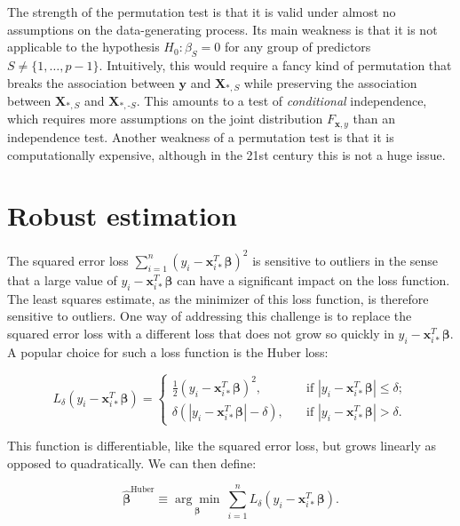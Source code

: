 \documentclass[
  11pt,
  letterpaper,
  oneside]{book}
\theoremstyle{definition}
\theoremstyle{plain}
\theoremstyle{plain}
\theoremstyle{plain}
\theoremstyle{remark}
\begin{document}
The strength of the permutation test is that it is valid under almost no
assumptions on the data-generating process. Its main weakness is that it
is not applicable to the hypothesis \(H_0: \beta_S = 0\) for any group
of predictors \(S \neq \{1, \dots, p-1\}\). Intuitively, this would
require a fancy kind of permutation that breaks the association between
\(\boldsymbol{y}\) and \(\boldsymbol{X}_{*, S}\) while preserving the
association between \(\boldsymbol{X}_{*, S}\) and
\(\boldsymbol{X}_{*, \text{-}S}\). This amounts to a test of
\emph{conditional} independence, which requires more assumptions on the
joint distribution \(F_{\boldsymbol{x}, y}\) than an independence test.
Another weakness of a permutation test is that it is computationally
expensive, although in the 21st century this is not a huge issue.

\hypertarget{sec-robust-estimation}{%
\chapter{Robust estimation}\label{sec-robust-estimation}}

The squared error loss
\(\sum_{i = 1}^n (y_i - \boldsymbol{x}_{i*}^T \boldsymbol{\beta})^2\) is
sensitive to outliers in the sense that a large value of
\(y_i - \boldsymbol{x}_{i*}^T \boldsymbol{\beta}\) can have a
significant impact on the loss function. The least squares estimate, as
the minimizer of this loss function, is therefore sensitive to outliers.
One way of addressing this challenge is to replace the squared error
loss with a different loss that does not grow so quickly in
\(y_i - \boldsymbol{x}_{i*}^T \boldsymbol{\beta}\). A popular choice for
such a loss function is the Huber loss:

\[
L_\delta(y_i - \boldsymbol{x}_{i*}^T \boldsymbol{\beta}) =
\begin{cases}
\frac{1}{2}(y_i - \boldsymbol{x}_{i*}^T \boldsymbol{\beta})^2, \quad &\text{if } |y_i - \boldsymbol{x}_{i*}^T \boldsymbol{\beta}| \leq \delta; \\
\delta(|y_i - \boldsymbol{x}_{i*}^T \boldsymbol{\beta}|-\delta), \quad &\text{if } |y_i - \boldsymbol{x}_{i*}^T \boldsymbol{\beta}| > \delta.
\end{cases}
\]

This function is differentiable, like the squared error loss, but grows
linearly as opposed to quadratically. We can then define:

\[
\boldsymbol{\widehat{\beta}}^{\text{Huber}} \equiv \underset{\boldsymbol{\beta}}{\arg \min}\ \sum_{i = 1}^n L_\delta(y_i - \boldsymbol{x}_{i*}^T \boldsymbol{\beta}).
\]
\end{document}
